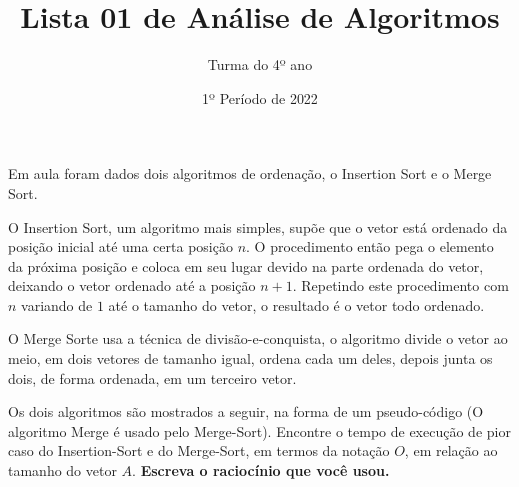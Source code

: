 \documentclass[12pt]{article}
\title{Lista 01 de Análise de Algoritmos}
\date{1º Período de 2022}
\author{Turma do 4º ano}
\begin{document}
\maketitle


\vspace{3em}

Em aula foram dados dois algoritmos de ordenação, o Insertion Sort e o Merge Sort. 

O Insertion Sort, um algoritmo mais simples, supõe que o vetor está ordenado da posição inicial até uma certa posição $n$. O procedimento então pega o elemento da próxima posição e coloca em seu lugar devido na parte ordenada do vetor, deixando o vetor ordenado até a posição $n+1$.
Repetindo este procedimento com $n$ variando de $1$ até o tamanho do vetor, o resultado é o vetor todo ordenado.

O Merge Sorte usa a técnica de divisão-e-conquista, o algoritmo divide o vetor ao meio, em dois vetores de tamanho igual, ordena cada um deles, depois junta os dois, de forma ordenada, em um terceiro vetor.

Os dois algoritmos são mostrados a seguir, na forma de um pseudo-código (O algoritmo Merge é usado pelo Merge-Sort).
Encontre o tempo de execução de pior caso do Insertion-Sort e do Merge-Sort, em termos da notação $O$, em relação ao tamanho do vetor $A$. \textbf{Escreva o raciocínio que você usou.}







\end{document}
